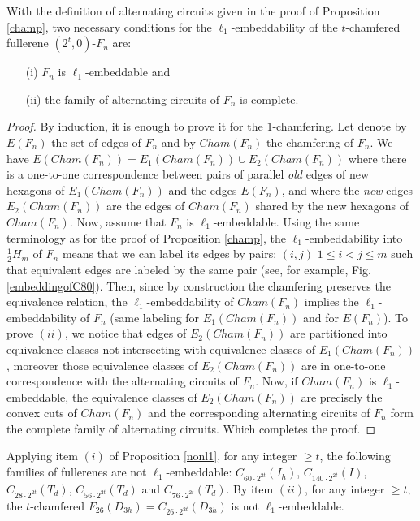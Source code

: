 \begin{proposition}\label{nonl1}$\:$\\
With the definition of alternating circuits given in the proof of Proposition \ref{champ},
two necessary conditions for the $\ell_1$-embeddability of the $t$-chamfered fullerene $(2^t,0)$-$F_n$ are:
\begin{itemize}
\item[(i)] $F_n$ is $\ell_1$-embeddable and
\item[(ii)] the family of alternating circuits of $F_n$ is complete.
\end{itemize} 
\begin{proof}
By induction, it is enough to prove it for the $1$-chamfering. Let denote
by $E(F_n)$ the set of edges of $F_n$ and by $Cham(F_n)$ the chamfering
of $F_n$. We have $E(Cham(F_n))=E_1(Cham(F_n))\cup E_2(Cham(F_n))$
where there is a one-to-one correspondence between pairs of parallel {\it old}
edges of new hexagons of $E_1(Cham(F_n))$  and the edges $E(F_n)$, and where the {\it new}
edges $E_2(Cham(F_n))$ are the edges of $Cham(F_n)$ shared by the new
hexagons of $Cham(F_n)$. Now, assume that $F_n$ is $\ell_1$-embeddable.
Using the same terminology as for the proof of Proposition \ref{champ},
the $\ell_1$-embeddability into $\frac{1}{2}H_m$ of $F_n$ means that we can 
label its edges by pairs: $(i,j)$ $1\leq i<j\leq m$ such that equivalent 
edges are labeled
by the same pair (see, for example, Fig. \ref{embeddingofC80}).
Then, since by construction the chamfering preserves the equivalence
relation, the $\ell_1$-embeddability of $Cham(F_n)$ implies the
$\ell_1$-embeddability of $F_n$ (same labeling for $E_1(Cham(F_n))$
and for $E(F_n)$). To prove $(ii)$, we notice that edges of $E_2(Cham(F_n))$
are partitioned into equivalence classes not intersecting with 
equivalence classes of $E_1(Cham(F_n))$, moreover those equivalence
classes of $E_2(Cham(F_n))$ are in one-to-one correspondence with
the alternating circuits of $F_n$. Now, if $Cham(F_n)$ is 
$\ell_1$-embeddable, the equivalence classes of $E_2(Cham(F_n))$
are precisely the convex cuts of $Cham(F_n)$ and the corresponding
alternating circuits of $F_n$ form the complete family of alternating
circuits. Which completes the proof.
\end{proof}
\end{proposition}

\begin{proposition}\label{many}
Applying item $(i)$ of Proposition \ref{nonl1}, 
for any integer $\geq t$, the following families 
of fullerenes are not $\ell_1$-embeddable:
$C_{60\cdot 2^{2t}}(I_h)$, 
$C_{140\cdot 2^{2t}}(I)$, 
$C_{28\cdot 2^{2t}}(T_d)$, 
$C_{56\cdot 2^{2t}}(T_d)$ and  
$C_{76\cdot 2^{2t}}(T_d)$. 
By item $(ii)$, for any integer $\geq t$,
the $t$-chamfered $F_{26}(D_{3h})=C_{26\cdot 2^{2t}}(D_{3h})$ is not $\ell_1$-embeddable.
\end{proposition}

